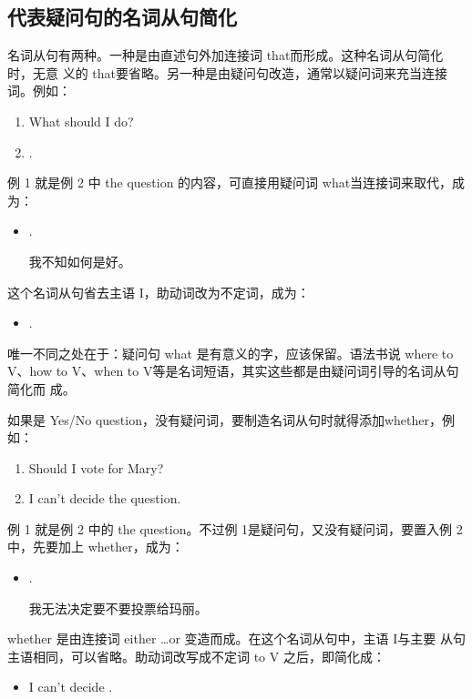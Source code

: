 \subsection{代表疑问句的名词从句简化}

名词从句有两种。一种是由直述句外加连接词 that而形成。这种名词从句简化时，无意
义的 that要省略。另一种是由疑问句改造，通常以疑问词来充当连接词。例如：
\begin{enumerate}
\item What should I do?
\item {}  .
\end{enumerate}
例 1 就是例 2 中 the question 的内容，可直接用疑问词 what当连接词来取代，成
为：
\begin{itemize}
\item {}  .

  我不知如何是好。
\end{itemize}
这个名词从句省去主语 I，助动词改为不定词，成为：
\begin{itemize}
\item {}  .
\end{itemize}
唯一不同之处在于：疑问句 what 是有意义的字，应该保留。语法书说 where to
V、how to V、when to V等是名词短语，其实这些都是由疑问词引导的名词从句简化而
成。

如果是 Yes/No question，没有疑问词，要制造名词从句时就得添加whether，例如：
\begin{enumerate}
\item Should I vote for Mary?
\item I can't decide the question.
\end{enumerate}
例 1 就是例 2 中的 the question。不过例 1是疑问句，又没有疑问词，要置入例 2
中，先要加上 whether，成为：
\begin{itemize}
\item {}   .

  我无法决定要不要投票给玛丽。
\end{itemize}
whether 是由连接词 either \ldots or 变造而成。在这个名词从句中，主语 I与主要
从句主语相同，可以省略。助动词改写成不定词 to V 之后，即简化成：
\begin{itemize}
\item I can't decide .
\end{itemize}


